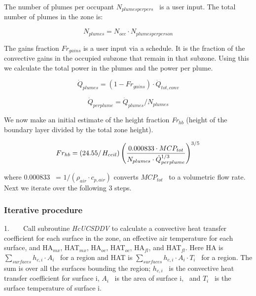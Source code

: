 The number of plumes per occupant \({N_{plumesperpers}}\) ~is a user input. The total number of plumes in the zone is:

\begin{equation}
{N_{plumes}} = {N_{occ}} \cdot {N_{plumesperperson}}
\end{equation}

The gains fraction \(F{r_{gains}}\) is a user input via a schedule. It is the fraction of the convective gains in the occupied subzone that remain in that subzone. Using this we calculate the total power in the plumes and the power per plume.

\begin{equation}
{\dot Q_{plumes}} = (1 - F{r_{gains}}) \cdot {\dot Q_{tot,conv}}
\end{equation}

\begin{equation}
{\dot Q_{perplume}} = {\dot Q_{plumes}}/{N_{plumes}}
\end{equation}

We now make an initial estimate of the height fraction \emph{Fr\(_{hb}\)} (height of the boundary layer divided by the total zone height).

\begin{equation}
F{r_{hb}} = \left( {{{24.55} \mathord{\left/ {\vphantom {{24.55} {{H_{ceil}}}}} \right. } {{H_{ceil}}}}} \right){\left( {\frac{{0.000833 \cdot MC{P_{tot}}}}{{{N_{plumes}} \cdot \dot Q_{perplume}^{1/3}}}} \right)^{3/5}}
\end{equation}

where 0.000833~ = \(1/({\rho_{air}} \cdot {c_{p,air}})\) converts \(MC{P_{tot}}\) ~to a volumetric flow rate. Next we iterate over the following 3 steps.

\subsubsection{Iterative procedure}\label{iterative-procedure}

1.~~~~Call subroutine \emph{HcUCSDDV} to calculate a convective heat transfer coefficient for each surface in the zone, an effective air temperature for each surface, and HA\(_{mx}\), HAT\(_{mx}\), HA\(_{oc}\), HAT\(_{oc}\), HA\(_{fl}\), and HAT\(_{fl}\). Here HA is \(\sum\limits_{surfaces} {{h_{c,i}}} \cdot {A_i}\) ~for a region and HAT is \(\sum\limits_{surfaces} {{h_{c,i}}} \cdot {A_i} \cdot {T_i}\) ~for a region. The sum is over all the surfaces bounding the region; \({h_{c,i}}\) ~is the convective heat transfer coefficient for surface i, \({A_i}\) ~is the area of surface i,~ and \({T_i}\) ~is the surface temperature of surface i.

